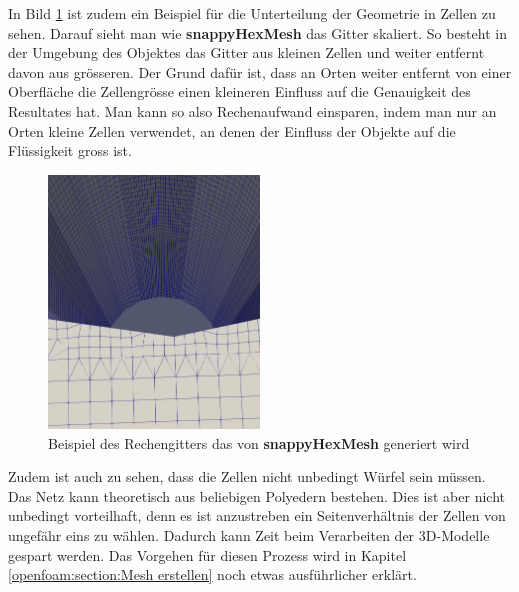 In Bild \ref{openfoam:fig:sim_grid} ist zudem ein Beispiel für die Unterteilung der Geometrie in Zellen zu sehen.
Darauf sieht man wie \textbf{snappyHexMesh} das Gitter skaliert.
So besteht in der Umgebung des Objektes das Gitter aus kleinen Zellen und weiter entfernt davon aus grösseren.
Der Grund dafür ist, dass an Orten weiter entfernt von einer Oberfläche die Zellengrösse einen kleineren Einfluss auf die Genauigkeit des Resultates hat.
Man kann so also Rechenaufwand einsparen, indem man nur an Orten kleine Zellen verwendet, an denen der Einfluss der Objekte auf die Flüssigkeit gross ist.
\begin{figure}
	\centering
	\includegraphics[width=0.5\textwidth]{papers/openfoam/Bilder/grid.png }
	\caption{Beispiel des Rechengitters das von \textbf{snappyHexMesh} generiert wird}
	\label{openfoam:fig:sim_grid}
\end{figure}
Zudem ist auch zu sehen, dass die Zellen nicht unbedingt Würfel sein müssen.
Das Netz kann theoretisch aus beliebigen Polyedern bestehen.
Dies ist aber nicht unbedingt vorteilhaft, denn es ist anzustreben ein Seitenverhältnis der Zellen von ungefähr eins zu wählen. 
Dadurch kann Zeit beim Verarbeiten der 3D-Modelle gespart werden.
Das Vorgehen für diesen Prozess wird in Kapitel \ref{openfoam:section:Mesh erstellen} noch etwas ausführlicher erklärt.
